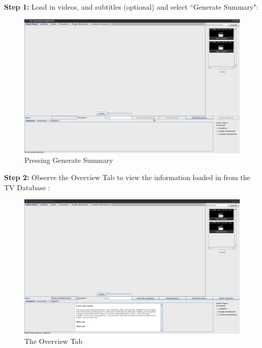 \textbf{Step 1:} Load in videos, and subtitles (optional) and select ``Generate Summary":
\begin{figure}[h1]
\begin{center}
 \includegraphics[trim = 0mm 0mm 0mm 0mm, clip,
 scale=0.22]{Images/01PressingGenerate.png}
  \caption{Pressing Generate Summary}
 \end{center}
\end{figure}

\textbf{Step 2:} Observe the Overview Tab to view the information loaded in from the TV Database \cite{tvdb}:
\begin{figure}[h1]
\begin{center}
 \includegraphics[trim = 0mm 0mm 0mm 0mm, clip,
 scale=0.22]{Images/02OverviewTab.png}
  \caption{The Overview Tab}
 \end{center}
\end{figure}

\newpage

